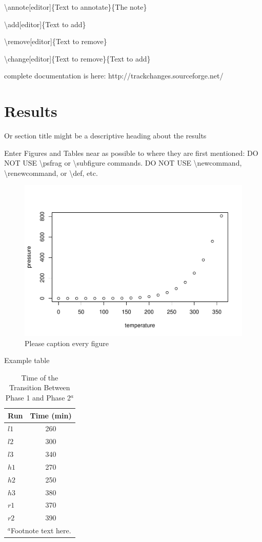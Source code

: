 \documentclass[draft,linenumbers]{agujournal2018}
\begin{document}
\textbackslash{}annote{[}editor{]}\{Text to annotate\}\{The note\}

\textbackslash{}add{[}editor{]}\{Text to add\}

\textbackslash{}remove{[}editor{]}\{Text to remove\}

\textbackslash{}change{[}editor{]}\{Text to remove\}\{Text to add\}

complete documentation is here: http://trackchanges.sourceforge.net/

\section{Results}

Or section title might be a descriptive heading about the results

Enter Figures and Tables near as possible to where they are first
mentioned: DO NOT USE \textbackslash{}psfrag or
\textbackslash{}subfigure commands. DO NOT USE
\textbackslash{}newcommand, \textbackslash{}renewcommand, or
\textbackslash{}def, etc.

\begin{figure}[h]
\includegraphics{GRL_Template_files/figure-latex/unnamed-chunk-2-1} \caption{Please caption every figure}\label{fig:unnamed-chunk-2}
\end{figure}

Example table

\begin{table}
 \caption{Time of the Transition Between Phase 1 and Phase 2$^{a}$}
 \centering
 \begin{tabular}{l c}
 \hline
  Run  & Time (min)  \\
 \hline
   $l1$  & 260   \\
   $l2$  & 300   \\
   $l3$  & 340   \\
   $h1$  & 270   \\
   $h2$  & 250   \\
   $h3$  & 380   \\
   $r1$  & 370   \\
   $r2$  & 390   \\
 \hline
 \multicolumn{2}{l}{$^{a}$Footnote text here.}
 \end{tabular}
 \end{table}
\end{document}
